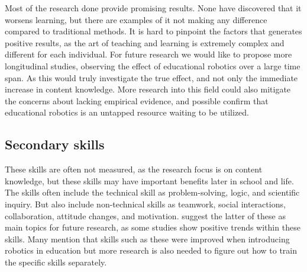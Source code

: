 \bigskip\noindent
Most of the research done provide promising results. None have discovered that it worsens learning, but there are examples of it not making any difference compared to traditional methods. It is hard to pinpoint the factors that generates positive results, as the art of teaching and learning is extremely complex and different for each individual. 
For future research we would like to propose more longitudinal studies, observing the effect of educational robotics over a large time span. 
As this would truly investigate the true effect, and not only the immediate increase in content knowledge. 
More research into this field could also mitigate the concerns about lacking empirical evidence, and possible confirm that educational robotics is
an untapped resource waiting to be utilized. 

\subsection{Secondary skills}
These skills are often not measured, as the research focus is on content knowledge, but these skills may have important benefits later in school and life.
The skills often include the technical skill as problem-solving, logic, and scientific inquiry. But also include non-technical skills as teamwork, social interactions, collaboration, attitude changes, and motivation.
\citeauthor{Benitti2012978} suggest the latter of these as main topics for future research, as some studies show positive trends within these skills. 
Many mention that skills such as these were improved when introducing robotics in education but more research is also needed to figure out how to train the specific skills separately. 


